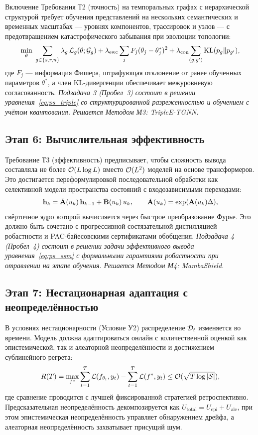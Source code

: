 Включение Требования Т2 (точность) на темпоральных графах с иерархической структурой требует обучения представлений на нескольких семантических и временных масштабах --- уровнях компонентов, трассировок и узлов --- с предотвращением катастрофического забывания при эволюции топологии:
\begin{equation}
\min_\theta\;
\sum_{g\in\{s,r,n\}}\lambda_g\,\mathcal{L}_g(\theta;\mathcal{G}_g)
+ \lambda_{\mathrm{ewc}}\sum_j F_j(\theta_j-\theta_{j}^{*})^2
+ \lambda_{\mathrm{con}}\!\sum_{(g,g')}\mathrm{KL}(p_g\|p_{g'}),
\label{eq:ps_triple}
\end{equation}
где $F_j$ --- информация Фишера, штрафующая отклонение от ранее обученных параметров $\theta^*$, а член KL-дивергенции обеспечивает межуровневую согласованность. \emph{Подзадача 3 (Пробел~3) состоит в решении уравнения~\eqref{eq:ps_triple} со структурированной разреженностью и обучением с учётом квантования. Решается Методом М3: TripleE-TGNN.}


\subsection{Этап 6: Вычислительная эффективность}

Требование Т3 (эффективность) предписывает, чтобы сложность вывода составляла не более $\mathcal{O}(L\log L)$ вместо $\mathcal{O}(L^2)$ моделей на основе трансформеров. Это достигается переформулировкой последовательной обработки как селективной модели пространства состояний с входозависимыми переходами:
\begin{equation}
\mathbf{h}_{k} = \bar{\mathbf{A}}(u_k)\,\mathbf{h}_{k-1} + \bar{\mathbf{B}}(u_k)\,u_k,
\qquad
\bar{\mathbf{A}}(u_k)=\exp(\mathbf{A}(u_k)\Delta),
\label{eq:ps_ssm}
\end{equation}
свёрточное ядро которой вычисляется через быстрое преобразование Фурье. Это должно быть сочетано с прогрессивной состязательной дистилляцией робастности и PAC-байесовскими сертификатами обобщения. \emph{Подзадача 4 (Пробел~4) состоит в решении задачи эффективного вывода уравнения~\eqref{eq:ps_ssm} с формальными гарантиями робастности при отравлении на этапе обучения. Решается Методом М4: MambaShield.}


\subsection{Этап 7: Нестационарная адаптация с неопределённостью}

В условиях нестационарности (Условие У2) распределение $\mathcal{D}_t$ изменяется во времени. Модель должна адаптироваться онлайн с количественной оценкой как эпистемической, так и алеаторной неопределённости и достижением сублинейного регрета:
\begin{equation}
R(T) = \max_{f^*}\sum_{t=1}^{T}\mathcal{L}(f_{\theta_t},y_t) - \sum_{t=1}^{T}\mathcal{L}(f^*,y_t) \le \mathcal{O}(\sqrt{T\log|\mathcal{S}|}),
\label{eq:ps_regret}
\end{equation}
где сравнение проводится с лучшей фиксированной стратегией ретроспективно. Предсказательная неопределённость декомпозируется как $U_{\mathrm{total}} = U_{\mathrm{epi}} + U_{\mathrm{ale}}$, при этом эпистемическая неопределённость управляет обнаружением дрейфа, а алеаторная неопределённость захватывает присущий шум.

